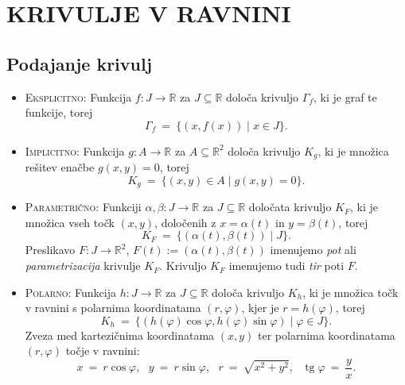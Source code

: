 \documentclass[11pt]{article}
\DeclareMathOperator{\tg}{tg}
\theoremstyle{definition}
\theoremstyle{definition}
\theoremstyle{definition}
\theoremstyle{theorem}
\begin{document}

\pagebreak


\section{KRIVULJE V RAVNINI}
\vspace{0.5cm}


\subsection{Podajanje krivulj}
\vspace{0.5cm}

\begin{itemize}
	\item \textsc{Eksplicitno:} Funkcija $f: J \rightarrow \mathbb{R}$ za $J \subseteq \mathbb{R}$ določa krivuljo $\Gamma_f$, ki je graf te funkcije, torej
	$$\Gamma_f ~=~ \{(x, f(x)) \mid x \in J\}.$$
	\item \textsc{Implicitno:} Funkcija $g: A \rightarrow \mathbb{R}$ za $A \subseteq \mathbb{R}^2$ določa krivuljo $K_g$, ki je množica rešitev enačbe $g(x, y) = 0$, torej
	$$K_g ~=~ \{(x, y) \in A \mid g(x, y) = 0\}.$$
	\item \textsc{Parametrično:} Funkciji $\alpha, \beta: J \rightarrow \mathbb{R}$ za $J \subseteq \mathbb{R}$ določata krivuljo $K_F$, ki je množica vseh točk $(x, y)$, določenih z $x = \alpha(t)$ in $y = \beta(t)$, torej
	$$K_F ~=~ \{(\alpha(t), \beta(t)) \mid J\}.$$
	Preslikavo $F: J \rightarrow \mathbb{R}^2$, $F(t) := (\alpha(t), \beta(t))$ imenujemo \textit{pot} ali \textit{parametrizacija} krivulje $K_F$. Krivuljo $K_F$ imenujemo tudi \textit{tir} poti $F$.
	\item \textsc{Polarno:} Funkcija $h: J \rightarrow \mathbb{R}$ za $J \subseteq \mathbb{R}$ določa krivuljo $K_h$, ki je množica točk v ravnini s polarnima koordinatama $(r, \varphi)$, kjer je $r = h(\varphi)$, torej
	$$K_h ~=~ \{(h(\varphi)\cos{\varphi}, h(\varphi)\sin{\varphi}) \mid \varphi \in J\}.$$
	Zveza med kartezičnima koordinatama $(x, y)$ ter polarnima koordinatama $(r, \varphi)$ točje v ravnini:
	$$x ~=~ r \cos{\varphi}, ~~~y ~=~ r \sin{\varphi}, ~~~r ~=~ \sqrt{x^2 + y^2}, ~~~\tg{\varphi} ~=~ \frac{y}{x}.$$
\end{itemize}
\vspace{0.5cm}
\end{document}
